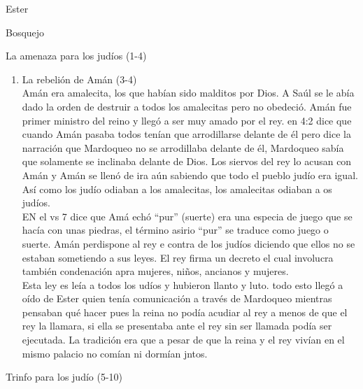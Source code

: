 \documentclass[12pt]{article}
\begin{document}
\begin{section}{Ester}
\begin{subsection}{Bosquejo}
\begin{subsubsection}{La amenaza para los judíos (1-4)}
\begin{enumerate}
					Lacostumbre era quqe cada una de las candidatas a reina debería tener 6 meses de tratamiento de belleza con aceite de mirra, seguida de ortos seis meses de tratamientos con perfumes y cosméticos.\\
					En el turno de ester para presentarse delante del rey, todo lo que ella eseara de ropas y regales le era provisto. Nunca más podía salir del palacio a menos de que el rey le llamara por su nombre.\\
					Cuando llegó el turno de ester, el rey quedó tan complacido con ella que la coronó como reina y así Ester se convirtiría en reina. Ester no declaró  su nacionalidad a consejo de su primo. Al final del cap se narra que Mardoqueo escucha una conspiración entre 2 hombres que estaban tramando matar al rey, lso 2 conspiradores son atrapados y matados.
				\item La rebelión de Amán (3-4)\\
					Amán era amalecita, los que habían sido malditos por Dios. A Saúl se le abía dado la orden de destruir a todos los amalecitas pero no obedeció. Amán fue primer ministro del reino y llegó a ser muy amado por el rey. en 4:2 dice que cuando Amán pasaba todos tenían que arrodillarse delante de él pero dice la narración que Mardoqueo no se arrodillaba delante de él, Mardoqueo sabía que solamente se inclinaba delante de Dios. Los siervos del rey lo acusan con Amán y Amán se llenó de ira aún sabiendo que todo el pueblo judío era igual. Así como los judío odiaban a los amalecitas, los amalecitas odiaban a os judíos.\\
					EN el vs 7 dice que Amá echó ``pur'' (suerte) era una especia de juego que se hacía con unas piedras, el término asirio ``pur'' se traduce como juego o suerte. Amán perdispone al rey e contra de los judíos diciendo que ellos no se estaban sometiendo a sus leyes. El rey firma un decreto el cual involucra también condenación apra mujeres, niños, ancianos y mujeres.\\
					Esta ley es leía a todos los udíos y hubieron llanto y luto. todo esto llegó a oído de Ester quien tenía comunicación a través de Mardoqueo mientras pensaban qué hacer pues la reina no podía acudiar al rey a menos de que el rey la llamara, si ella se presentaba ante el rey sin ser llamada podía ser ejecutada. La tradición era que a pesar de que la reina y el rey vivían en el mismo palacio no comían ni dormían jntos.
			\end{enumerate}
		\end{subsubsection}
		\begin{subsubsection}{Trinfo para los judío (5-10)}

\end{subsubsection}
\end{subsection}
\end{section}
\end{document}
